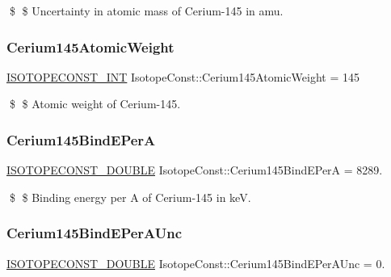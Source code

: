\$ \$ Uncertainty in atomic mass of Cerium-\/145 in amu. \mbox{\label{group___isotope_const-_cerium-_ce145_ga49c1c0781c8a0e9bbb1f9885eb2475b2}} 
\subsubsection{\texorpdfstring{Cerium145\+Atomic\+Weight}{Cerium145AtomicWeight}}
{\footnotesize\ttfamily \mbox{\hyperlink{group___isotope_const-_macros_ga5f18360b3e99483a35c32d789e62621c}{I\+S\+O\+T\+O\+P\+E\+C\+O\+N\+S\+T\+\_\+\+I\+NT}} Isotope\+Const\+::\+Cerium145\+Atomic\+Weight = 145}

\$ \$ Atomic weight of Cerium-\/145. \mbox{\label{group___isotope_const-_cerium-_ce145_gae8980316611b73785e74135c7959a657}} 
\subsubsection{\texorpdfstring{Cerium145\+Bind\+E\+PerA}{Cerium145BindEPerA}}
{\footnotesize\ttfamily \mbox{\hyperlink{group___isotope_const-_macros_ga8f45a7272ce02c0b4c65c44636ed719a}{I\+S\+O\+T\+O\+P\+E\+C\+O\+N\+S\+T\+\_\+\+D\+O\+U\+B\+LE}} Isotope\+Const\+::\+Cerium145\+Bind\+E\+PerA = 8289.}

\$ \$ Binding energy per A of Cerium-\/145 in keV. \mbox{\label{group___isotope_const-_cerium-_ce145_ga25215d30de6c1d6e75bf2aca027965f2}} 
\subsubsection{\texorpdfstring{Cerium145\+Bind\+E\+Per\+A\+Unc}{Cerium145BindEPerAUnc}}
{\footnotesize\ttfamily \mbox{\hyperlink{group___isotope_const-_macros_ga8f45a7272ce02c0b4c65c44636ed719a}{I\+S\+O\+T\+O\+P\+E\+C\+O\+N\+S\+T\+\_\+\+D\+O\+U\+B\+LE}} Isotope\+Const\+::\+Cerium145\+Bind\+E\+Per\+A\+Unc = 0.}

